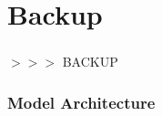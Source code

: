 \section*{Backup}

\begin{frame}
    \frametitle{}
    \centering
    \huge
    \alert{$>>>$ BACKUP}

\end{frame}

\begin{frame}
    \frametitle{Model Architecture}

    

\end{frame}